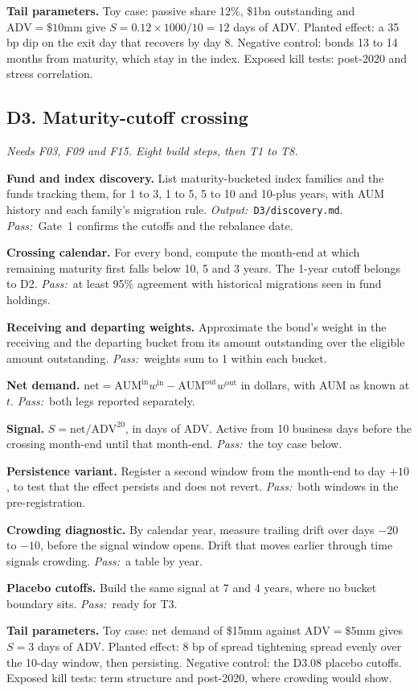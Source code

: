 \documentclass[11pt,letterpaper]{article}
\makeatletter
\newcommand{\code}[1]{\texttt{#1}}
\newcommand{\ADV}{\mathrm{ADV}}
\newcommand*{\twodigit}[1]{\expandafter\@twodigit\csname c@#1\endcsname}
\newcommand*{\@twodigit}[1]{\ifnum#1<10 0\fi\number#1}
\newcommand{\stepname}[1]{\textbf{#1.}}
\newcommand{\Out}{\textit{Output:}~}
\newcommand{\Pass}{\textit{Pass:}~}
\makeatother
\begin{document}
\textbf{Tail parameters.} Toy case: passive share 12\%, \$1bn outstanding and $\ADV=\$10$mm give $S=0.12\times1000/10=12$ days of ADV. Planted effect: a 35 bp dip on the exit day that recovers by day 8. Negative control: bonds 13 to 14 months from maturity, which stay in the index. Exposed kill tests: post-2020 and stress correlation.

\subsection{D3. Maturity-cutoff crossing}
\emph{Needs F03, F09 and F15. Eight build steps, then T1 to T8.}
\begin{ladder}[label=\textbf{D3.\twodigit*}]
\item \stepname{Fund and index discovery} List maturity-bucketed index families and the funds tracking them, for 1 to 3, 1 to 5, 5 to 10 and 10-plus years, with AUM history and each family's migration rule. \Out \code{D3/discovery.md}. \Pass Gate~1 confirms the cutoffs and the rebalance date.
\item \stepname{Crossing calendar} For every bond, compute the month-end at which remaining maturity first falls below 10, 5 and 3 years. The 1-year cutoff belongs to D2. \Pass at least 95\% agreement with historical migrations seen in fund holdings.
\item \stepname{Receiving and departing weights} Approximate the bond's weight in the receiving and the departing bucket from its amount outstanding over the eligible amount outstanding. \Pass weights sum to 1 within each bucket.
\item \stepname{Net demand} $\mathrm{net}=\mathrm{AUM}^{\mathrm{in}}w^{\mathrm{in}}-\mathrm{AUM}^{\mathrm{out}}w^{\mathrm{out}}$ in dollars, with AUM as known at $t$. \Pass both legs reported separately.
\item \stepname{Signal} $S=\mathrm{net}/\ADV^{20}$, in days of ADV. Active from 10 business days before the crossing month-end until that month-end. \Pass the toy case below.
\item \stepname{Persistence variant} Register a second window from the month-end to day $+10$, to test that the effect persists and does not revert. \Pass both windows in the pre-registration.
\item \stepname{Crowding diagnostic} By calendar year, measure trailing drift over days $-20$ to $-10$, before the signal window opens. Drift that moves earlier through time signals crowding. \Pass a table by year.
\item \stepname{Placebo cutoffs} Build the same signal at 7 and 4 years, where no bucket boundary sits. \Pass ready for T3.
\end{ladder}
\textbf{Tail parameters.} Toy case: net demand of \$15mm against $\ADV=\$5$mm gives $S=3$ days of ADV. Planted effect: 8 bp of spread tightening spread evenly over the 10-day window, then persisting. Negative control: the D3.08 placebo cutoffs. Exposed kill tests: term structure and post-2020, where crowding would show.
\end{document}

